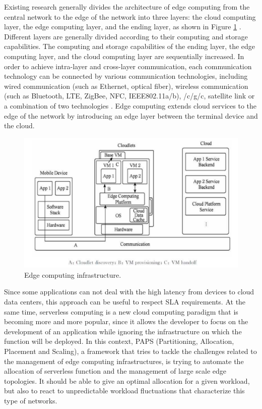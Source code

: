 Existing research generally divides the architecture of edge computing from the central network to the 
edge of the network into three layers: the cloud computing layer, the edge computing layer, and the ending
layer, as shown in Figure \ref{fig:edge_infr} \cite{Edge3,Edge4,Edge5}. Different layers are generally divided according to their computing 
and storage capabilities. The computing and storage capabilities of the ending layer, the edge computing
layer, and the cloud computing layer are sequentially increased. In order to achieve intra-layer and
cross-layer communication, each communication technology can be connected by various communication 
technologies, including wired communication (such as Ethernet, optical fiber), wireless communication 
(such as Bluetooth, LTE, ZigBee, NFC, IEEE802.11a/b), /c/g/c, satellite link or a combination of two 
technologies \cite{Communication}. Edge computing extends cloud services to the edge of the network by introducing an edge 
layer between the terminal device and the cloud.

\begin{figure}
    \includegraphics[width=\textwidth]{Images/Edge_infrastructure.png}
    \caption{Edge computing infrastructure.}
    \label{fig:edge_infr}
\end{figure}

Since some applications can not deal with the high latency from devices to cloud data centers, this approach 
can be useful to respect SLA requirements. 
At the same time, serverless computing is a new cloud computing paradigm that is becoming more
and more popular, since it allows the developer to focus on the development of an application
while ignoring the infrastructure on which the function will be deployed. In this context, 
PAPS (Partitioning, Allocation, Placement and Scaling), a framework that tries to tackle the challenges related to the management of edge computing infrastructures, 
is trying to automate the allocation of serverless function and the management of large scale edge topologies.
It should be able to give an optimal allocation for a given workload, but also
to react to unpredictable workload fluctuations that characterize this type of networks.

